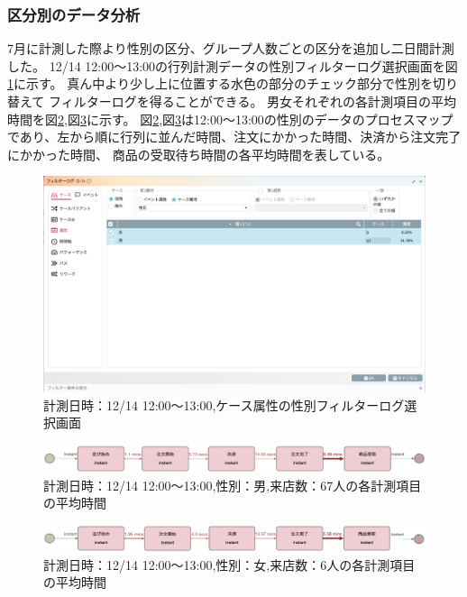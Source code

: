 \documentclass{jsarticle}
\begin{document}
\subsubsection{区分別のデータ分析}

7月に計測した際より性別の区分、グループ人数ごとの区分を追加し二日間計測した。
12/14 12:00〜13:00の行列計測データの性別フィルターログ選択画面を図\ref{fig:1214mw}に示す。
真ん中より少し上に位置する水色の部分のチェック部分で性別を切り替えて
フィルターログを得ることができる。
男女それぞれの各計測項目の平均時間を図\ref{fig:man1},図\ref{fig:woman1}に示す。
図\ref{fig:man1},図\ref{fig:woman1}は12:00〜13:00の性別のデータのプロセスマップであり、左から順に行列に並んだ時間、注文にかかった時間、決済から注文完了にかかった時間、
商品の受取待ち時間の各平均時間を表している。

\begin{figure}[H]
  \centering
  \includegraphics[width=15cm]{1214mw.png}
  \caption{計測日時：12/14 12:00〜13:00,ケース属性の性別フィルターログ選択画面}
  \label{fig:1214mw}
\end{figure}

\begin{figure}[H]
  \centering
  \includegraphics[width=15cm]{man1.png}
  \caption{計測日時：12/14 12:00〜13:00,性別：男,来店数：67人の各計測項目の平均時間}
  \label{fig:man1}
\end{figure}
  
\begin{figure}[H]
  \centering
  \includegraphics[width=15cm]{woman1.png}
  \caption{計測日時：12/14 12:00〜13:00,性別：女,来店数：6人の各計測項目の平均時間}
  \label{fig:woman1}
\end{figure}
\end{document}
